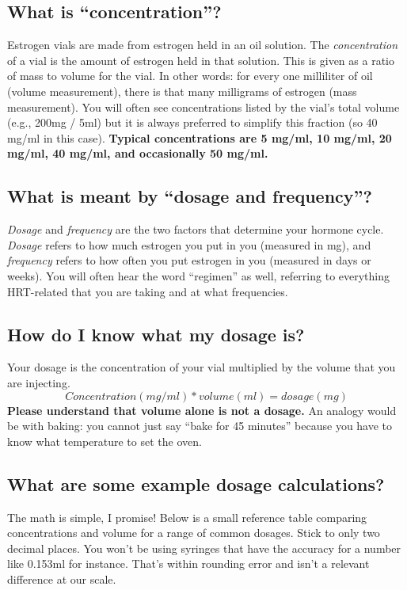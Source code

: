 \documentclass{article}
\begin{document}
\subsection{What is “concentration”?}

Estrogen vials are made from estrogen held in an oil solution. The \textit{concentration} of a vial is the amount of estrogen held in that solution. This is given as a ratio of mass to volume for the vial. In other words: for every one milliliter of oil (volume measurement), there is that many milligrams of estrogen (mass measurement). You will often see concentrations listed by the vial’s total volume (e.g., 200mg / 5ml) but it is always preferred to simplify this fraction (so 40 mg/ml in this case). \textbf{Typical concentrations are 5 mg/ml, 10 mg/ml, 20 mg/ml, 40 mg/ml, and occasionally 50 mg/ml.}

\subsection{What is meant by “dosage and frequency”?}

\textit{Dosage} and \textit{frequency} are the two factors that determine your hormone cycle. \textit{Dosage} refers to how much estrogen you put in you (measured in mg), and \textit{frequency} refers to how often you put estrogen in you (measured in days or weeks). You will often hear the word “regimen” as well, referring to everything HRT-related that you are taking and at what frequencies.

\subsection{How do I know what my dosage is?}

Your dosage is the concentration of your vial multiplied by the volume that you are injecting. \[Concentration (mg/ml) * volume (ml) = dosage (mg)\] \textbf{Please understand that volume alone is not a dosage.} An analogy would be with baking: you cannot just say “bake for 45 minutes” because you have to know what temperature to set the oven.

\subsection{What are some example dosage calculations?}

The math is simple, I promise! Below is a small reference table comparing concentrations and volume for a range of common dosages. Stick to only two decimal places. You won’t be using syringes that have the accuracy for a number like 0.153ml for instance. That’s within rounding error and isn’t a relevant difference at our scale.
\end{document}
